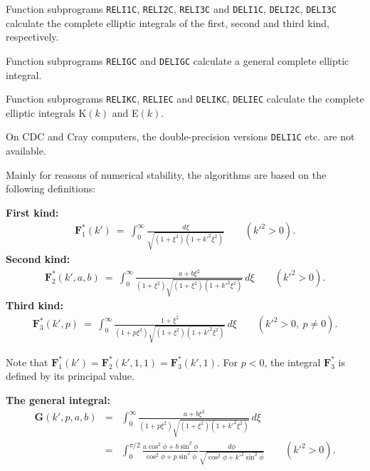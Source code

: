                       
                  
\Submitter{}                           
                      \Revised{}
Function subprograms {\tt RELI1C}, {\tt RELI2C}, {\tt RELI3C}
and {\tt DELI1C}, {\tt DELI2C}, {\tt DELI3C} calculate
the complete elliptic integrals of the first, second and
third kind, respectively.
\par
Function subprograms {\tt RELIGC} and {\tt DELIGC} calculate a general
complete elliptic integral.
\par
Function subprograms {\tt RELIKC}, {\tt RELIEC} and {\tt DELIKC},
{\tt DELIEC} calculate the complete elliptic integrals K$(k)$ and
E$(k)$.
\par
On CDC and Cray computers, the double-precision versions {\tt DELI1C}
etc. are not available.
\par
Mainly for reasons of numerical stability, the algorithms are based on
the following definitions:
\par
{\bf First kind:}
\begin{eqnarray*}
\mathbf{F}_1^*(k') \ = \  \displaystyle
\int_0^\infty \frac{d\xi}{\sqrt{(1+\xi^2)(1+{k'}^2\xi^2)}}
\qquad ({k'}^2 > 0).
\end{eqnarray*}
{\bf Second kind:}
\begin{eqnarray*}
\mathbf{F}_2^*(k',a,b) \ = \ \displaystyle
\int_0^\infty \frac{a+b\xi^2}{(1+\xi^2)\sqrt{(1+\xi^2)(1+{k'}^2\xi^2)}}
\, d\xi \qquad ({k'}^2 > 0).
\end{eqnarray*}
{\bf Third kind:}
\begin{eqnarray*}
\mathbf{F}_3^*(k',p) \ = \ \displaystyle
\int_0^\infty \frac{1+\xi^2}{(1+p\xi^2)\sqrt{(1+\xi^2)(1+{k'}^2\xi^2)}}
\, d\xi \qquad ({k'}^2 > 0, \ p \ne 0).
\end{eqnarray*}
\par
Note that $\mathbf{F}_1^*(k') = \mathbf{F}_2^*(k',1,1) =
\mathbf{F}_3^*(k',1)$. For $p < 0$, the integral $\mathbf{F}_3^*$ is
defined by its principal value.
\par
{\bf The general integral:}
\begin{eqnarray*}
\mathbf{G}(k',p,a,b) & = & \displaystyle
\int_0^\infty \frac{a+b\xi^2}{(1+p\xi^2)\sqrt{(1+\xi^2)(1+{k'}^2\xi^2)}}
\, d\xi  \\[3mm]
& = & \displaystyle \int_0^{\pi/2} \frac{a \cos^2 \phi + b \sin^2 \phi}
{\cos^2 \phi + p \sin^2 \phi} \frac{d\phi}
{\sqrt{\cos^2 \phi + {k'}^2 \sin^2 \phi}} \qquad ({k'}^2 > 0).
\end{eqnarray*}
